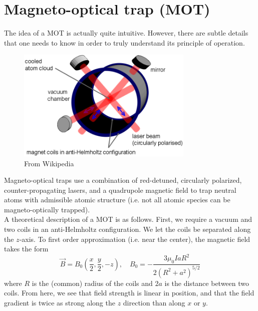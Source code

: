 \documentclass{book}
\theoremstyle{definition}
\newcommand{\f}[2]{\frac{#1}{#2}}
\newcommand{\lp}{\left(}
\newcommand{\rp}{\right)}
\begin{document}






\section*{Magneto-optical trap (MOT)} 

The idea of a MOT is actually quite intuitive. However, there are subtle details that one needs to know in order to truly understand its principle of operation. 

\begin{figure}[!htb]
	\centering
	\includegraphics[width=0.75\textwidth]{images/MOT}
	\caption{From Wikipedia}
\end{figure}

Magneto-optical traps use a combination of red-detuned, circularly polarized, counter-propagating lasers, and a quadrupole magnetic field to trap neutral atoms with admissible atomic structure (i.e. not all atomic species can be magneto-optically trapped). \\


A theoretical description of a MOT is as follows. First, we require a vacuum and two coils in an anti-Helmholtz configuration. We let the coils be separated along the $z$-axis. To first order approximation (i.e. near the center), the magnetic field takes the form
\begin{equation*}
\vec{B} = B_0 \lp \f{x}{2}, \f{y}{2}, -z \rp, \quad B_0 = -\f{3\mu_0 I a R^2}{2(R^2 + a^2)^{5/2}}
\end{equation*}
where $R$ is the (common) radius of the coils and $2a$ is the distance between two coils. From here, we see that field strength is linear in position, and that the field gradient is twice as strong along the $z$ direction than along $x$ or $y$. 
\end{document}
